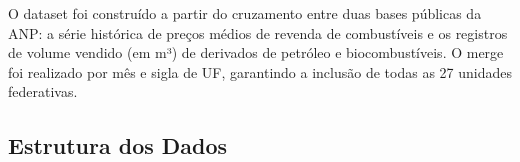 \documentclass[11pt, a4paper, oneside]{article}
\begin{document}
\vspace{6mm}

O dataset foi construído a partir do cruzamento entre duas bases públicas da ANP: a
série histórica de preços médios de revenda de combustíveis e os registros de volume
vendido (em m³) de derivados de petróleo e biocombustíveis. O merge foi realizado por
mês e sigla de UF, garantindo a inclusão de todas as 27 unidades federativas.

\subsection{Estrutura dos Dados}
\label{sec:dataset-estrutura}
\end{document}

